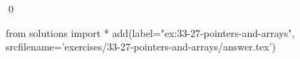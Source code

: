 
\begin{ex}
  \label{ex:33-27-pointers-and-arrays}
  
  \qed
\end{ex}
\begin{python0}
from solutions import *
add(label="ex:33-27-pointers-and-arrays",
    srcfilename='exercises/33-27-pointers-and-arrays/answer.tex')
\end{python0}
